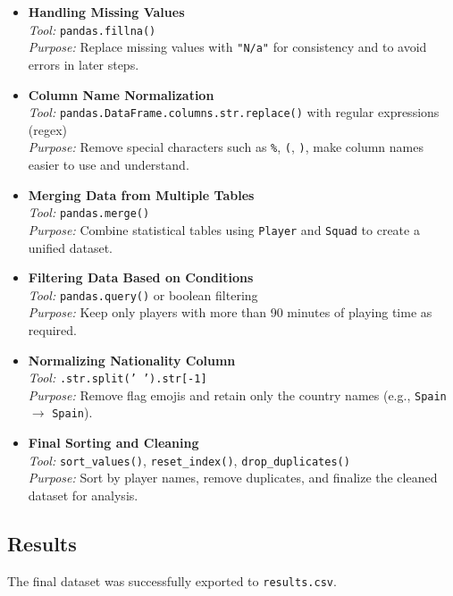 \documentclass[12pt,a4paper]{article}
\begin{document}
\begin{itemize}
    \item \textbf{Handling Missing Values} \\
    \textit{Tool:} \texttt{pandas.fillna()} \\
    \textit{Purpose:} Replace missing values with \texttt{"N/a"} for consistency and to avoid errors in later steps.

    \item \textbf{Column Name Normalization} \\
    \textit{Tool:} \texttt{pandas.DataFrame.columns.str.replace()} with regular expressions (regex) \\
    \textit{Purpose:} Remove special characters such as \texttt{\%}, \texttt{(}, \texttt{)}, make column names easier to use and understand.

    \item \textbf{Merging Data from Multiple Tables} \\
    \textit{Tool:} \texttt{pandas.merge()} \\
    \textit{Purpose:} Combine statistical tables using \texttt{Player} and \texttt{Squad} to create a unified dataset.

    \item \textbf{Filtering Data Based on Conditions} \\
    \textit{Tool:} \texttt{pandas.query()} or boolean filtering \\
    \textit{Purpose:} Keep only players with more than 90 minutes of playing time as required.

    \item \textbf{Normalizing Nationality Column} \\
    \textit{Tool:} \texttt{.str.split(' ').str[-1]} \\
    \textit{Purpose:} Remove flag emojis and retain only the country names (e.g., \texttt{Spain} $\rightarrow$ \texttt{Spain}).

    \item \textbf{Final Sorting and Cleaning} \\
    \textit{Tool:} \texttt{sort\_values()}, \texttt{reset\_index()}, \texttt{drop\_duplicates()} \\
    \textit{Purpose:} Sort by player names, remove duplicates, and finalize the cleaned dataset for analysis.
\end{itemize}

\subsection{Results}
The final dataset was successfully exported to \texttt{results.csv}.
\end{document}
